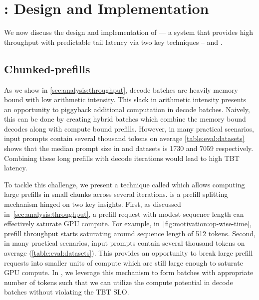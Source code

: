 \section{\sysname : Design and Implementation}\label{sec:design}
 We now discuss the design and implementation of \sysname{} --- a system that provides high throughput with predictable tail latency via two key techniques -- \chunking and \hbatch.
 






\subsection{Chunked-prefills}
\label{sec-design-chunkedprefill}

As we show in \autoref{sec:analysis:throughput}, decode batches are heavily memory bound with low arithmetic intensity. This slack in arithmetic intensity presents an opportunity to piggyback additional computation in decode batches. Naively, this can be done by creating hybrid batches which combine the memory bound decodes along with compute bound prefills. However, in many practical scenarios, input prompts contain several thousand tokens on average \eg \autoref{table:eval:datasets} shows that the median prompt size in \sharegpt and \arxivsum datasets is 1730 and 7059 respectively. Combining these long prefills with decode iterations would lead to high TBT latency.

To tackle this challenge, we present a technique called \chunking which allows computing large prefills in small chunks across several iterations. \Chunking is a prefill splitting mechanism hinged on two key insights. First, as discussed in~\autoref{sec:analysis:throughput}, a prefill request with modest sequence length can effectively saturate GPU compute. For example, in~\autoref{fig:motivation:op-wise-time}, prefill throughput starts saturating around sequence length of 512 tokens. Second, in many practical scenarios, input prompts contain several thousand tokens on average (\autoref{table:eval:datasets}). This provides an opportunity to break large prefill requests into smaller units of compute which are still large enough to saturate GPU compute. In \sysname, we leverage this mechanism to form batches with appropriate number of tokens such that we can utilize the compute potential in decode batches without violating the TBT SLO.




